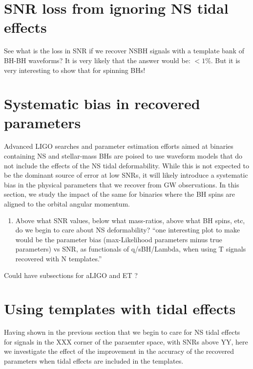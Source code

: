 \documentclass[aps,prd,amsmath,floats,floatfix, twocolumn,
superscriptaddress,nofootinbib,showpacs]{revtex4-1}
\begin{document}
\section{SNR loss from ignoring NS tidal effects}
See what is the loss in SNR if we recover NSBH signals with a template bank of
BH-BH waveforms? It is very likely that the answer would be: $<1\%$. But it
is very interesting to show that for spinning BHs!

\section{Systematic bias in recovered parameters}
Advanced LIGO searches and parameter estimation efforts aimed at binaries 
containing NS and stellar-mass BHs are poised to use waveform models that do not
include the effects of the NS tidal deformability. While this is not expected to
be the dominant source of error at low SNRs, it will likely introduce a
systematic bias in the physical parameters that we recover from GW observations.
In this section, we study the impact of the same for binaries where the BH spins
are aligned to the orbital angular momentum.

\begin{enumerate}
\item Above what SNR values, below what mass-ratios, above what BH spins, etc, 
do we begin to care about NS deformability?\newline
``one interesting plot to make would be the parameter bias (max-Likelihood
parameters minus true parameters) vs SNR, as functionals of q/sBH/Lambda, when
using T signals recovered with N templates.''
\end{enumerate}


Could have subsections for aLIGO and ET ?

\section{Using templates with tidal effects}
Having shown in the previous section that we begin to care for NS tidal effects
for signals in the XXX corner of the paraemter space, with SNRs above YY, here
we investigate the effect of the improvement in the accuracy of the recovered
parameters when tidal effects are included in the templates.
\end{document}
